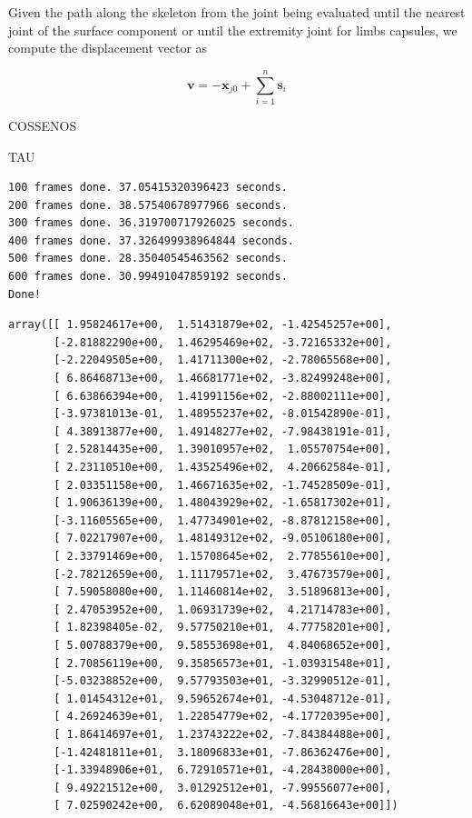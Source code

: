 \documentclass{vgtc}
\newcommand{\prompt}[4]{
        \llap{{\color{#2}[#3]: #4}}\vspace{-1.25em}
    }
\begin{document}
Given the path along the skeleton from the joint being evaluated until
the nearest joint of the surface component or until the extremity joint
for limbs capsules, we compute the displacement vector as

\begin{equation}
\label{eq:dispvector}
\mathbf{v} = \mathbf{-x}_{j0} + \sum_{i=1}^{n} \mathbf{s}_i
\end{equation}

COSSENOS

TAU



    \begin{Verbatim}[commandchars=\\\{\}]
100 frames done. 37.05415320396423 seconds.
200 frames done. 38.57540678977966 seconds.
300 frames done. 36.319700717926025 seconds.
400 frames done. 37.326499938964844 seconds.
500 frames done. 28.35040545463562 seconds.
600 frames done. 30.99491047859192 seconds.
Done!
\end{Verbatim}


            \begin{tcolorbox}[breakable, boxrule=.5pt, size=fbox, pad at break*=1mm, opacityfill=0]
\prompt{Out}{outcolor}{39}{\hspace{3.5pt}}
\begin{Verbatim}[commandchars=\\\{\}]
array([[ 1.95824617e+00,  1.51431879e+02, -1.42545257e+00],
       [-2.81882290e+00,  1.46295469e+02, -3.72165332e+00],
       [-2.22049505e+00,  1.41711300e+02, -2.78065568e+00],
       [ 6.86468713e+00,  1.46681771e+02, -3.82499248e+00],
       [ 6.63866394e+00,  1.41991156e+02, -2.88002111e+00],
       [-3.97381013e-01,  1.48955237e+02, -8.01542890e-01],
       [ 4.38913877e+00,  1.49148277e+02, -7.98438191e-01],
       [ 2.52814435e+00,  1.39010957e+02,  1.05570754e+00],
       [ 2.23110510e+00,  1.43525496e+02,  4.20662584e-01],
       [ 2.03351158e+00,  1.46671635e+02, -1.74528509e-01],
       [ 1.90636139e+00,  1.48043929e+02, -1.65817302e+01],
       [-3.11605565e+00,  1.47734901e+02, -8.87812158e+00],
       [ 7.02217907e+00,  1.48149312e+02, -9.05106180e+00],
       [ 2.33791469e+00,  1.15708645e+02,  2.77855610e+00],
       [-2.78212659e+00,  1.11179571e+02,  3.47673579e+00],
       [ 7.59058080e+00,  1.11460814e+02,  3.51896813e+00],
       [ 2.47053952e+00,  1.06931739e+02,  4.21714783e+00],
       [ 1.82398405e-02,  9.57750210e+01,  4.77758201e+00],
       [ 5.00788379e+00,  9.58553698e+01,  4.84068652e+00],
       [ 2.70856119e+00,  9.35856573e+01, -1.03931548e+01],
       [-5.03238852e+00,  9.57793503e+01, -3.32990512e-01],
       [ 1.01454312e+01,  9.59652674e+01, -4.53048712e-01],
       [ 4.26924639e+01,  1.22854779e+02, -4.17720395e+00],
       [ 1.86414697e+01,  1.23743222e+02, -7.84384488e+00],
       [-1.42481811e+01,  3.18096833e+01, -7.86362476e+00],
       [-1.33948906e+01,  6.72910571e+01, -4.28438000e+00],
       [ 9.49221512e+00,  3.01292512e+01, -7.99556077e+00],
       [ 7.02590242e+00,  6.62089048e+01, -4.56816643e+00]])
\end{Verbatim}
\end{tcolorbox}
        
\end{document}
